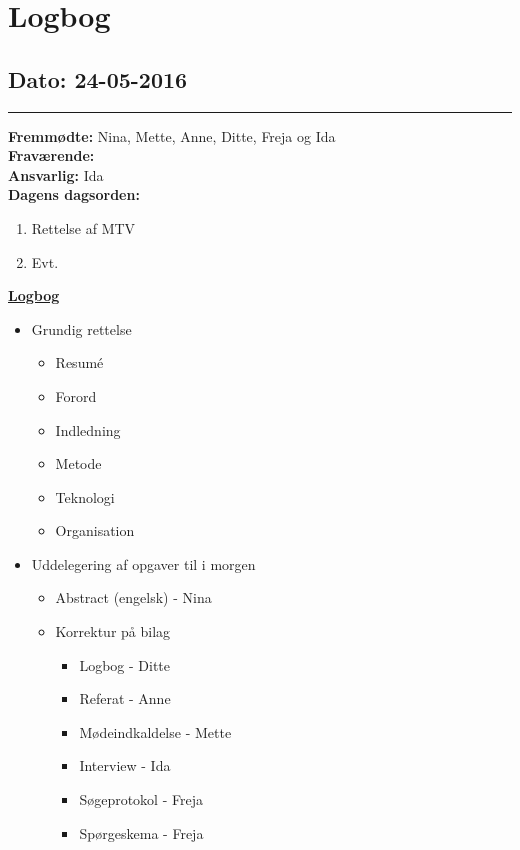 \chapter{Logbog}
\section{Dato: 24-05-2016}
\hrule
\textbf{Fremmødte:} Nina, Mette, Anne, Ditte, Freja og Ida  \\
\textbf{Fraværende: } \\
\textbf{Ansvarlig:} Ida  \\
\textbf{Dagens dagsorden: }
\begin{enumerate}
\item Rettelse af MTV
\item Evt.
\end{enumerate}

\underline{\textbf{Logbog}}
\begin{itemize}
\item Grundig rettelse
\begin{itemize}
\item Resumé
\item Forord
\item Indledning
\item Metode
\item Teknologi
\item Organisation
\end{itemize}
\item Uddelegering af opgaver til i morgen
\begin{itemize}
\item Abstract (engelsk) - Nina
\item Korrektur på bilag
\begin{itemize}
\item Logbog - Ditte
\item Referat - Anne
\item Mødeindkaldelse - Mette
\item Interview - Ida
\item Søgeprotokol - Freja
\item Spørgeskema - Freja
\end{itemize}
\end{itemize}
\end{itemize}
\newpage